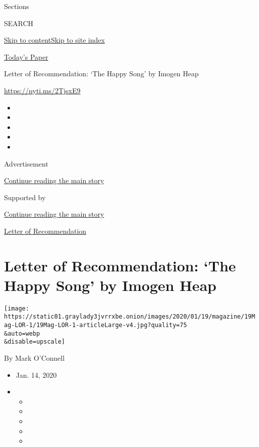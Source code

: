 Sections

SEARCH

\protect\hyperlink{site-content}{Skip to
content}\protect\hyperlink{site-index}{Skip to site index}

\href{https://myaccount.nytimes3xbfgragh.onion/auth/login?response_type=cookie\&client_id=vi}{}

\href{https://www.nytimes3xbfgragh.onion/section/todayspaper}{Today's
Paper}

Letter of Recommendation: `The Happy Song' by Imogen Heap

\url{https://nyti.ms/2TjsxE9}

\begin{itemize}
\item
\item
\item
\item
\item
\end{itemize}

Advertisement

\protect\hyperlink{after-top}{Continue reading the main story}

Supported by

\protect\hyperlink{after-sponsor}{Continue reading the main story}

\href{/column/letter-of-recommendation}{Letter of Recommendation}

\hypertarget{letter-of-recommendation-the-happy-song-by-imogen-heap}{%
\section{Letter of Recommendation: `The Happy Song' by Imogen
Heap}\label{letter-of-recommendation-the-happy-song-by-imogen-heap}}

\texttt{[image: https://static01.graylady3jvrrxbe.onion/images/2020/01/19/magazine/19Mag-LOR-1/19Mag-LOR-1-articleLarge-v4.jpg?quality=75\\\&auto=webp\\\&disable=upscale]}

By Mark O'Connell

\begin{itemize}
\item
  Jan. 14, 2020
\item
  \begin{itemize}
  \item
  \item
  \item
  \item
  \item
  \end{itemize}
\end{itemize}

